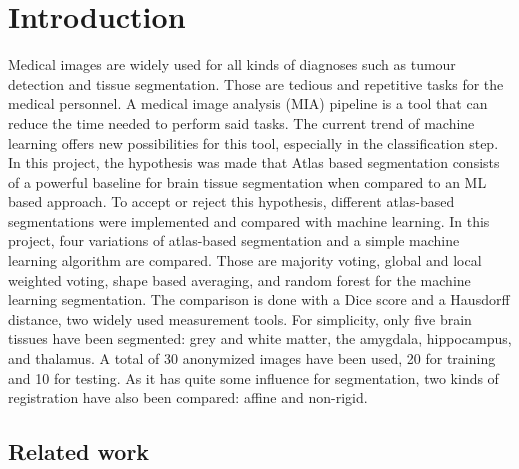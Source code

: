 \section*{Introduction}
Medical images are widely used for all kinds of diagnoses such as tumour detection and tissue segmentation. Those are tedious and repetitive tasks for the medical personnel. A medical image analysis (MIA) pipeline is a tool that can reduce the time needed to perform said tasks. The current trend of machine learning offers new possibilities for this tool, especially in the classification step.
In this project, the hypothesis was made that Atlas based segmentation consists of a powerful baseline for brain tissue segmentation when compared to an ML based approach. To accept or reject this hypothesis, different atlas-based segmentations were implemented and compared with machine learning.
In this project, four variations of atlas-based segmentation and a simple machine learning algorithm are compared. Those are majority voting, global and local weighted voting, shape based averaging, and random forest for the machine learning segmentation. The comparison is done with a Dice score and a Hausdorff distance, two widely used measurement tools. For simplicity, only five brain tissues have been segmented: grey and white matter, the amygdala, hippocampus, and thalamus. A total of 30 anonymized images have been used, 20 for training and 10 for testing. As it has quite some influence for segmentation, two kinds of registration have also been compared: affine and non-rigid.

\subsection*{Related work}